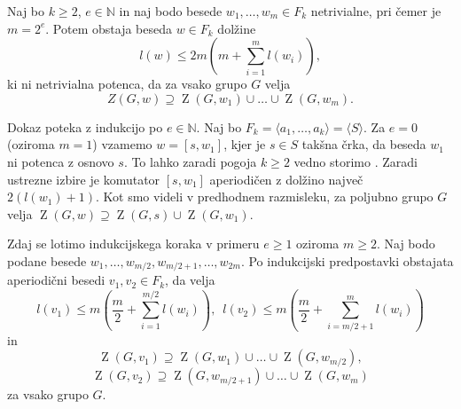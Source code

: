 \documentclass[mat1, tisk]{fmfdelo}
\numberwithin{equation}{section}  %
\begin{document}
\begin{lema}
    \label{lem_komutatorska_lema}
     Naj bo $k \ge 2$, $e \in  \mathbb{N}$ in naj bodo besede $w_1, \ldots, w_m \in F_k$ netrivialne, pri čemer je $m = 2^{e}$. Potem obstaja beseda $w \in F_k$
     dolžine \begin{equation*}
     l(w) \le 2m \left(m + \sum_{i=1}^{m} l(w_{i}) \right),
     \end{equation*}  
    ki ni netrivialna potenca, da za vsako grupo $G$ velja \begin{equation*}
    Z(G, w) \supseteq \operatorname{Z}(G, w_1) \cup \ldots \cup \operatorname{Z}(G, w_m).
    \end{equation*}       
\end{lema}
    \begin{dokaz}
        Dokaz poteka z indukcijo po $e \in  \mathbb{N}$. Naj bo $F_k = \langle a_1, \ldots , a_{k} \rangle = \langle S \rangle$.  Za $e = 0$ (oziroma $m = 1$) vzamemo $w = [s, w_1]$, kjer je $s \in S$ takšna črka, da beseda $w_1$ ni potenca z osnovo $s$. 
        To lahko zaradi pogoja $k \ge 2$ vedno storimo . Zaradi ustrezne izbire je komutator $[s, w_1]$ aperiodičen z dolžino največ $2(l(w_1)  + 1)$.
        Kot smo videli v predhodnem razmisleku, za poljubno grupo $G$ velja $\operatorname{Z}(G, w) \supseteq \operatorname{Z}(G, s) \cup \operatorname{Z}(G, w_1)$.
        
        Zdaj se lotimo indukcijskega koraka v primeru $e \ge 1$ oziroma $m \ge 2$. Naj bodo podane besede $w_1, \ldots, w_{m / 2}, w_{m / 2 + 1}, \ldots, w_{2m}$. Po indukcijski predpostavki obstajata aperiodični besedi $v_1, v_2 \in  F_{k}$,  da velja
        \begin{equation*}
        l(v_1) \le m \left(\frac{m}{2} + \sum_{i=1}^{m / 2} l(w_{i}) \right), \,\,\, l(v_2) \le m \left(\frac{m}{2} + \sum_{i= m / 2 + 1}^{m} l(w_{i}) \right)
        \end{equation*}  
        in \begin{equation*}
        \operatorname{Z}(G, v_1) \supseteq \operatorname{Z}(G, w_1) \cup \ldots \cup \operatorname{Z}(G, w_{m / 2}),
        \end{equation*}  
        \begin{equation*}
            \operatorname{Z}(G, v_2) \supseteq \operatorname{Z}(G, w_{m / 2 + 1}) \cup \ldots \cup \operatorname{Z}(G, w_{m})
        \end{equation*}  
        za vsako grupo $G$.



\end{dokaz}
\end{document}

